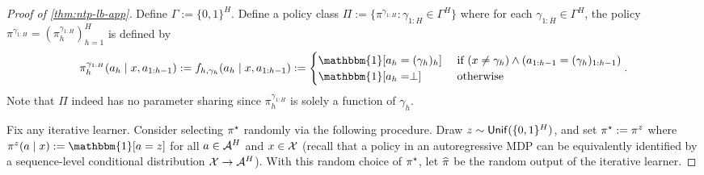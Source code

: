 \begin{proof}[Proof of \cref{thm:ntp-lb-app}]
Define $\Gamma := \{0,1\}^H$. Define a policy class $\Pi := \{\pi^{\gamma_{1:H}}: \gamma_{1:H} \in \Gamma^H\}$ where for each $\gamma_{1:H} \in \Gamma^H$, the policy $\pi^{\gamma_{1:H}} = (\pi^{\gamma_{1:H}}_h)_{h=1}^H$ is defined by
\[\pi^{\gamma_{1:H}}_h(a_h\mid{}x,a_{1:h-1}) := f_{h,\gamma_h}(a_h\mid{}x,a_{1:h-1}) := \begin{cases} 
\mathbbm{1}[a_h = (\gamma_h)_h] & \text{ if } (x \neq \gamma_h) \land (a_{1:h-1} = (\gamma_h)_{1:h-1}) \\ 
\mathbbm{1}[a_h = \perp] & \text{ otherwise}
\end{cases}.\]
Note that $\Pi$ indeed has no parameter sharing since $\pi^{\gamma_{1:H}}_h$ is solely a function of $\gamma_h$. 

Fix any iterative learner. Consider selecting $\pi^{\star}$ randomly via the following procedure. Draw $z \sim \mathsf{Unif}(\{0,1\}^H)$, and set $\pi^{\star} := \pi^z$ where $\pi^z(a\mid{}x) := \mathbbm{1}[a=z]$ for all $a \in \mathcal{A}^H$ and $x\in\mathcal{X}$ (recall that a policy in an autoregressive MDP can be equivalently identified by a sequence-level conditional distribution $\mathcal{X} \to \mathcal{A}^H$). With this random choice of $\pi^{\star}$, let $\widehat{\pi}$ be the random output of the iterative learner.


\end{proof}
